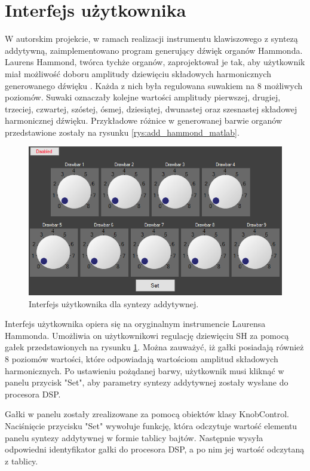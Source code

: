 \section{Interfejs użytkownika}
W autorskim projekcie, w ramach realizacji instrumentu klawiszowego z syntezą addytywną, zaimplementowano program generujący dźwięk organów Hammonda. 
Laurens Hammond, twórca tychże organów, zaprojektował je tak, aby użytkownik miał możliwość doboru amplitudy dziewięciu składowych harmonicznych generowanego dźwięku \cite{add_hammond_soundonsound}. Każda z nich była regulowana suwakiem na 8 możliwych poziomów. Suwaki oznaczały kolejne wartości amplitudy pierwszej, drugiej, trzeciej, czwartej, szóstej, ósmej, dziesiątej, dwunastej oraz szesnastej składowej harmonicznej dźwięku. Przykładowe różnice w generowanej barwie organów przedstawione zostały na rysunku \ref{rys:add_hammond_matlab}.
\begin{figure}[H]
	\centering
	\includegraphics[width=15cm]{grafiki/add_interface}
	\captionsetup{justification=centering}
	\caption{Interfejs użytkownika dla syntezy addytywnej.}
	\label{rys:add_interface}
\end{figure}

Interfejs użytkownika opiera się na oryginalnym instrumencie Laurensa Hammonda. Umożliwia on użytkownikowi regulację dziewięciu SH za pomocą gałek przedstawionych na rysunku \ref{rys:add_interface}. Można zauważyć, iż gałki posiadają również 8 poziomów wartości, które odpowiadają wartościom amplitud składowych harmonicznych. Po ustawieniu pożądanej barwy, użytkownik musi kliknąć w panelu przycisk "Set", aby parametry syntezy addytywnej zostały wysłane do procesora DSP.

Gałki w panelu zostały zrealizowane za pomocą obiektów klasy KnobControl. Naciśnięcie przycisku "Set" wywołuje funkcję, która odczytuje wartość elementu panelu syntezy addytywnej w formie tablicy bajtów. Następnie wysyła odpowiedni identyfikator gałki do procesora DSP, a po nim jej wartość odczytaną z tablicy.

